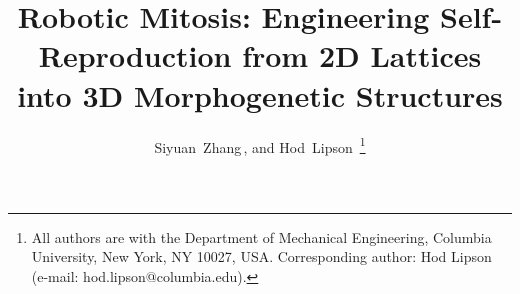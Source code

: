 \documentclass[lettersize,journal]{IEEEtran}
\begin{document}
\title{Robotic Mitosis: Engineering Self-Reproduction from 2D Lattices into 3D Morphogenetic Structures}




\author{Siyuan~Zhang\,, and Hod~Lipson\,
\thanks{All authors are with the Department of Mechanical Engineering, Columbia University, New York, NY 10027, USA. 
Corresponding author: Hod Lipson (e-mail: hod.lipson@columbia.edu).}%
}

\maketitle
\end{document}

